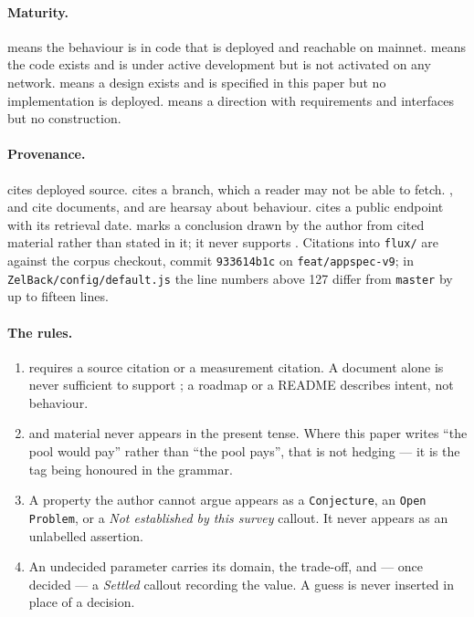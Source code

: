 \paragraph{Maturity.} \shipped means the behaviour is in code that is deployed and reachable on
mainnet. \inprogress means the code exists and is under active development but is not activated on
any network. \planned means a design exists and is specified in this paper but no implementation is
deployed. \vision means a direction with requirements and interfaces but no construction.

\paragraph{Provenance.}  cites deployed source. 
cites a branch, which a reader may not be able to fetch. ,  and
cite documents, and are hearsay about behaviour.  cites a public endpoint
with its retrieval date. \srcinferred{} marks a conclusion drawn by the author from cited material
rather than stated in it; it never supports \shipped. Citations into \texttt{flux/} are against the
corpus checkout, commit \texttt{933614b1c} on \texttt{feat/\allowbreak{}appspec-\allowbreak{}v9}; in
\texttt{ZelBack/\allowbreak{}config/\allowbreak{}default.js} the line numbers above 127 differ from
\texttt{master} by up to fifteen lines.

\paragraph{The rules.}
\begin{enumerate}
  \item \shipped requires a source citation or a measurement citation. A document alone is never
        sufficient to support \shipped; a roadmap or a README describes intent, not behaviour.
  \item \planned and \vision material never appears in the present tense. Where this paper writes
        ``the pool would pay'' rather than ``the pool pays'', that is not hedging --- it is the tag
        being honoured in the grammar.
  \item A property the author cannot argue appears as a \texttt{Conjecture}, an
        \texttt{Open Problem}, or a \emph{Not established by this survey} callout. It never appears
        as an unlabelled assertion.
  \item An undecided parameter carries its domain, the trade-off, and --- once decided --- a
        \emph{Settled} callout recording the value. A guess is never inserted in place of a decision.
\end{enumerate}

\FloatBarrier
